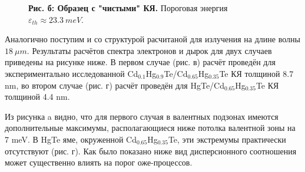 \documentclass[../main.tex]{subfiles}
\begin{document}
\begin{figure}[h!]
\begin{minipage}[h]{0.49\linewidth}
\begin{center}
                    \textbf{Рис. б: Образец с "чистыми" КЯ.} Пороговая энергия 
                        $\varepsilon_{th} \approx 23.3~meV$.
                \end{center}
            \end{minipage}
        \end{figure}
        
        Аналогично поступим и со структурой расчитаной для излучения на длине волны  
        $18~\mu m$. Результаты расчётов спектра электронов и дырок для двух случаев приведены на рисунке ниже. В первом случае (рис. в) расчёт проведён 
        для экспериментально исследованной Cd${}_{0.1}$Hg${}_{0.9}$Te/Cd${}_{0.65}$Hg${}_{0.35}$Te КЯ толщиной 8.7 nm, во втором случае (рис. г) расчёт проведён для 
        HgTe/Cd${}_{0.65}$Hg${}_{0.35}$Te КЯ толщиной 4.4 nm.

        Из рисунка a видно, что для первого случая в валентных подзонах имеются дополнительные максимумы, располагающиеся ниже потолка валентной 
        зоны на 7 meV. В HgTe яме, окруженной Cd${}_{0.65}$Hg${}_{0.35}$Te, эти экстремумы практически отсутствуют (рис. г). Как было показано ниже
        вид дисперсионного соотношения может существенно влиять на порог оже-процессов.
\end{document}
